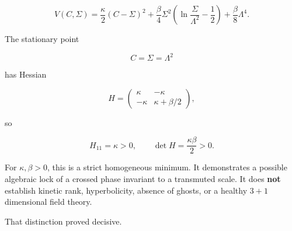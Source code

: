 \documentclass[
]{article}
\begin{document}
\[
V(C,\Sigma)
=\frac\kappa2(C-\Sigma)^2
+\frac\beta4\Sigma^2\left(\ln\frac{\Sigma}{\Lambda^2}-\frac12\right)
+\frac\beta8\Lambda^4.
\]

The stationary point

\[
C=\Sigma=\Lambda^2
\]

has Hessian

\[
H=
\begin{pmatrix}
\kappa&-\kappa\\
-\kappa&\kappa+\beta/2
\end{pmatrix},
\]

so

\[
H_{11}=\kappa>0,
\qquad
\det H=\frac{\kappa\beta}{2}>0.
\]

For \(\kappa,\beta>0\), this is a strict homogeneous minimum. It
demonstrates a possible algebraic lock of a crossed phase invariant to a
transmuted scale. It does \textbf{not} establish kinetic rank,
hyperbolicity, absence of ghosts, or a healthy \(3+1\) dimensional field
theory.

That distinction proved decisive.
\end{document}
